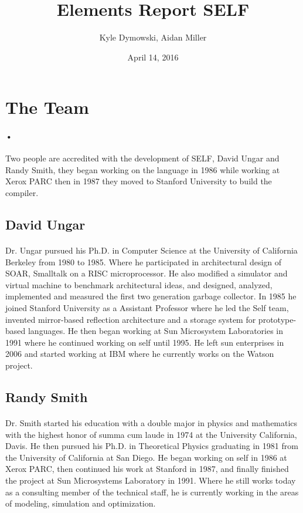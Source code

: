 \documentclass[12pt]{article}
\title{Elements Report SELF}
\author{Kyle Dymowski, Aidan Miller}
\date{April 14, 2016}
\begin{document}
\maketitle

\section{The Team}
\paragraph{•} Two people are accredited with the development of SELF, David Ungar and Randy Smith, they began working on the language in 1986 while working at Xerox PARC then in 1987 they moved to Stanford University to build the compiler. 
\subsection{David Ungar}
\paragraph{} Dr. Ungar pursued his Ph.D. in Computer Science at the University of California Berkeley from 1980 to 1985. Where he participated in architectural design of SOAR, Smalltalk on a RISC microprocessor. He also modified a simulator and virtual machine to benchmark architectural ideas, and designed, analyzed, implemented and measured the first two generation garbage collector. In 1985 he joined Stanford University as a Assistant Professor where he led the Self team, invented mirror-based reflection architecture and a storage system for prototype-based languages. He then began working at Sun Microsystem Laboratories in 1991 where he continued working on self until 1995. He left sun enterprises in 2006 and started working at IBM where he currently works on the Watson project. \cite{ungar}

\subsection{Randy Smith}
\paragraph{} Dr. Smith started his education with a double major in physics and mathematics with the highest honor of summa cum laude in 1974 at the University California, Davis. He then pursued his Ph.D. in Theoretical Physics graduating in 1981 from the University of California at San Diego. He began working on self in 1986 at Xerox PARC, then continued his work at Stanford in 1987, and finally finished the project at Sun Microsystems Laboratory in 1991. Where he still works today as a consulting member of the technical staff, he is currently working in the areas of modeling, simulation and optimization. \cite{smith}
\end{document}
